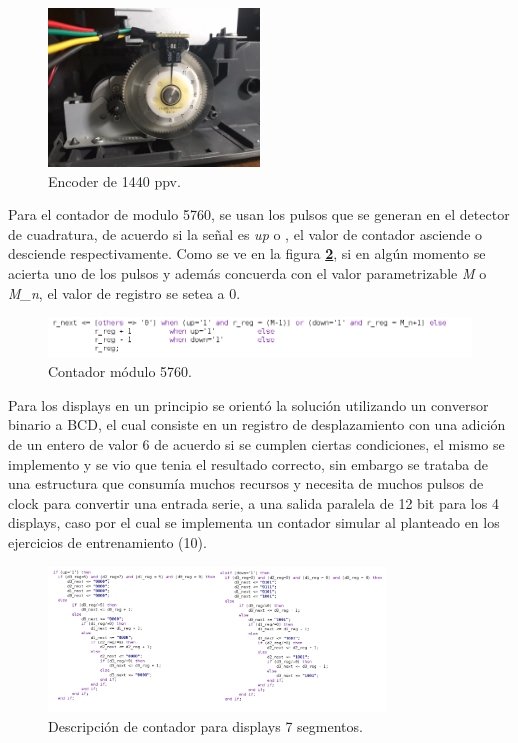 \documentclass[11pt, a4paper]{article}
\begin{document}
		\begin{figure}[H]
			\centering
			\includegraphics[width=0.5\textwidth]{Imagenes/encoder_real.jpeg}
			\caption{Encoder de 1440 ppv.}
			\label{fig:encoder_real}
		\end{figure} 

			Para el contador de modulo 5760, se usan los pulsos que se generan en el detector de cuadratura, de acuerdo si la señal es \textit{up} o , el valor de contador asciende o desciende respectivamente. Como se ve en la figura \textcolor{blue}{\textbf{\ref{fig:M}}}, si en algún momento se acierta uno de los pulsos y además concuerda con el valor parametrizable \textit{M} o \textit{M\_n}, el valor de registro se setea a 0.

		\begin{figure}[H]
			\centering
			\includegraphics[width=\textwidth]{Imagenes/mod5760.png}
			\caption{Contador módulo 5760.}
			\label{fig:M}
		\end{figure} 

		Para los displays en un principio se orientó la solución utilizando un conversor binario a BCD, el cual consiste en un registro de desplazamiento con una adición de un entero de valor 6 de acuerdo si se cumplen ciertas condiciones, el mismo se implemento y se vio que tenia el resultado correcto, sin embargo se trataba de una estructura que consumía muchos recursos y necesita de muchos pulsos de clock para convertir una entrada serie, a una salida paralela de 12 bit para los 4 displays, caso por el cual se implementa un contador simular al planteado en los ejercicios de entrenamiento (10).

		\begin{figure}[H]
			\centering
			\includegraphics[width=0.8\textwidth]{Imagenes/updown.png}
			\caption{Descripción de contador para displays 7 segmentos.}
			\label{fig:updown}
		\end{figure} 
		
\end{document}
